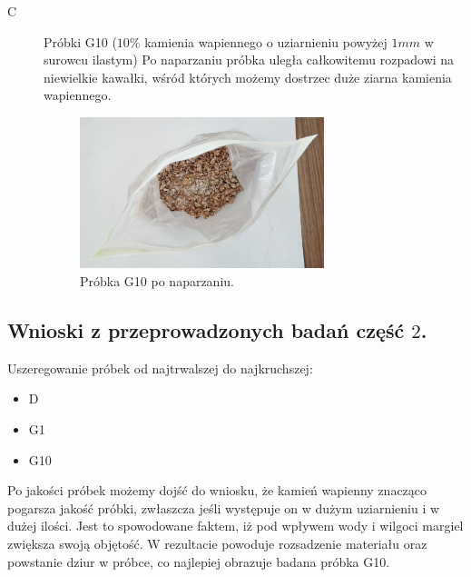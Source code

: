 \begin{description}
    \item[C] Próbki G10 ($10\%$ kamienia wapiennego o uziarnieniu powyżej $1mm$ w surowcu ilastym)  
    \newline
    Po naparzaniu próbka uległa całkowitemu rozpadowi na niewielkie 
    \newline
    kawałki, wśród których możemy dostrzec duże ziarna kamienia wapiennego. 

    \begin{figure}[H]
        \begin{center}
            \includegraphics[width=0.7\textwidth]{img/G10.jpg}           
            \caption{Próbka G10 po naparzaniu.}
        \end{center}
    \end{figure}

\end{description}

\subsection{Wnioski z przeprowadzonych badań część $2$.}

Uszeregowanie próbek od najtrwalszej do najkruchszej:
\begin{itemize}
    \item D
    \item G1
    \item G10
\end{itemize}

Po jakości próbek możemy dojść do wniosku, że kamień wapienny znacząco pogarsza jakość próbki, zwłaszcza jeśli występuje on w dużym uziarnieniu i w dużej ilości. Jest to spowodowane faktem, iż pod wpływem wody i wilgoci margiel zwiększa swoją objętość. W rezultacie powoduje rozsadzenie materiału oraz powstanie dziur w próbce, co najlepiej obrazuje badana próbka G10.

% 
% 

